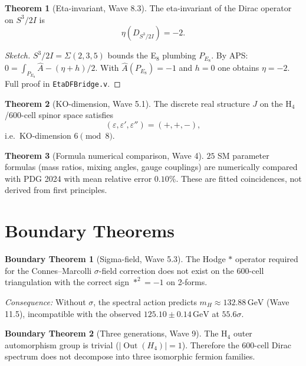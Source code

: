 \documentclass[11pt,a4paper]{article}
\theoremstyle{definition}
\newtheorem{theorem}{Theorem}[section]
\newtheorem{boundary}{Boundary Theorem}
\begin{document}
\begin{theorem}[Eta-invariant, Wave 8.3]\label{thm:eta}
  The eta-invariant of the Dirac operator on $S^3/2I$ is
  \begin{equation}
    \eta(D_{S^3/2I}) = -2.
  \end{equation}
\end{theorem}
\begin{proof}[Sketch]
  $S^3/2I = \Sigma(2,3,5)$ bounds the E$_8$ plumbing $P_{E_8}$.
  By APS:
  $0 = \int_{P_{E_8}} \hat{A} - (\eta + h)/2$.
  With $\hat{A}(P_{E_8}) = -1$ and $h = 0$ one obtains $\eta = -2$.
  Full proof in \texttt{EtaDFBridge.v}.
\end{proof}

\begin{theorem}[KO-dimension, Wave 5.1]\label{thm:ko}
  The discrete real structure $J$ on the H$_4$/600-cell spinor space
  satisfies
  \begin{equation}
    (\varepsilon, \varepsilon', \varepsilon'') = (+, +, -),
  \end{equation}
  i.e.\ KO-dimension $6 \pmod 8$.
\end{theorem}

\begin{theorem}[Formula numerical comparison, Wave 4]\label{thm:formulas}
  $25$ SM parameter formulas (mass ratios, mixing angles, gauge couplings)
  are numerically compared with PDG 2024 with mean relative error $0.10\%$.
  These are fitted coincidences, not derived from first principles.
\end{theorem}

\section{Boundary Theorems}\label{sec:boundary}

\begin{boundary}[Sigma-field, Wave 5.3]\label{boundary:sigma}
  The Hodge $*$ operator required for the Connes--Marcolli $\sigma$-field
correction does not exist on the 600-cell triangulation with the correct
sign $*^2 = -1$ on 2-forms.
\end{boundary}
\textit{Consequence:} Without $\sigma$, the spectral action predicts
$m_H \approx 132.88\,\text{GeV}$ (Wave 11.5), incompatible with the
observed $125.10 \pm 0.14\,\text{GeV}$ at $55.6\sigma$.

\begin{boundary}[Three generations, Wave 9]\label{boundary:3gen}
  The H$_4$ outer automorphism group is trivial ($|\operatorname{Out}(H_4)| = 1$).
  Therefore the 600-cell Dirac spectrum does not decompose into three
  isomorphic fermion families.
\end{boundary}
\end{document}
